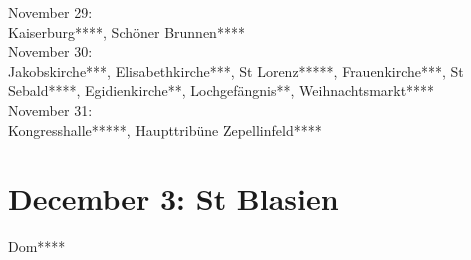 November 29:\\
Kaiserburg****, Sch\"oner Brunnen****\\

November 30:\\
Jakobskirche***, Elisabethkirche***, St Lorenz*****, Frauenkirche***, St Sebald****, Egidienkirche**, Lochgef\"angnis**, Weihnachtsmarkt****\\

November 31:\\
Kongresshalle*****, Haupttrib\"une Zepellinfeld****

\section{December 3: St Blasien}
\label{2008:StBlasien}

Dom****
